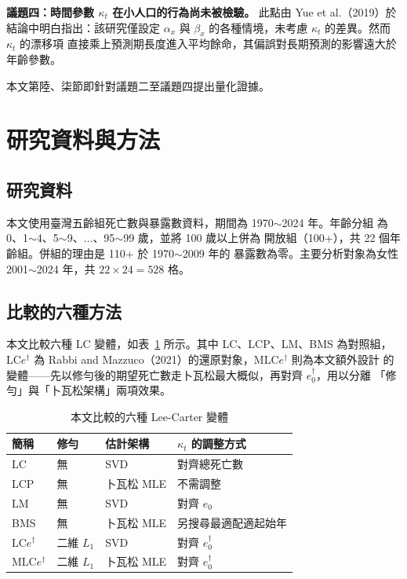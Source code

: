 \documentclass[UTF8, fontset=macnew, a4paper, 12pt]{ctexart}
\newcommand{\edag}{e_0^{\dagger}}
\newcommand{\LCe}{\mathrm{LC}e^{\dagger}}
\begin{document}
\textbf{議題四：時間參數 $\kappa_t$ 在小人口的行為尚未被檢驗。}
此點由 Yue et al.（2019）於結論中明白指出：該研究僅設定 $\alpha_x$ 與
$\beta_x$ 的各種情境，未考慮 $\kappa_t$ 的差異。然而 $\kappa_t$ 的漂移項
直接乘上預測期長度進入平均餘命，其偏誤對長期預測的影響遠大於年齡參數。

本文第陸、柒節即針對議題二至議題四提出量化證據。

\section{研究資料與方法}

\subsection{研究資料}

本文使用臺灣五齡組死亡數與暴露數資料，期間為 1970$\sim$2024 年。年齡分組
為 0、1$\sim$4、5$\sim$9、$\ldots$、95$\sim$99 歲，並將 100 歲以上併為
開放組（100+），共 22 個年齡組。併組的理由是 110+ 於 1970$\sim$2009 年的
暴露數為零。主要分析對象為女性 2001$\sim$2024 年，共 $22\times24=528$ 格。

\subsection{比較的六種方法}

本文比較六種 LC 變體，如表~\ref{tab:variants} 所示。其中 LC、LCP、LM、BMS 為對照組，
$\LCe$ 為 Rabbi and Mazzuco（2021）的還原對象，M$\LCe$ 則為本文額外設計
的變體——先以修勻後的期望死亡數走卜瓦松最大概似，再對齊 $\edag$，用以分離
「修勻」與「卜瓦松架構」兩項效果。

\begin{table}[H]
\centering
\caption{本文比較的六種 Lee-Carter 變體}
\small
\begin{tabular}{llll}
\toprule
簡稱 & 修勻 & 估計架構 & $\kappa_t$ 的調整方式\\
\midrule
LC      & 無 & SVD & 對齊總死亡數\\
LCP     & 無 & 卜瓦松 MLE & 不需調整\\
LM      & 無 & SVD & 對齊 $e_0$\\
BMS     & 無 & 卜瓦松 MLE & 另搜尋最適配適起始年\\
$\LCe$  & 二維 $L_1$ & SVD & 對齊 $\edag$\\
M$\LCe$ & 二維 $L_1$ & 卜瓦松 MLE & 對齊 $\edag$\\
\bottomrule
\end{tabular}
\label{tab:variants}
\end{table}
\end{document}
